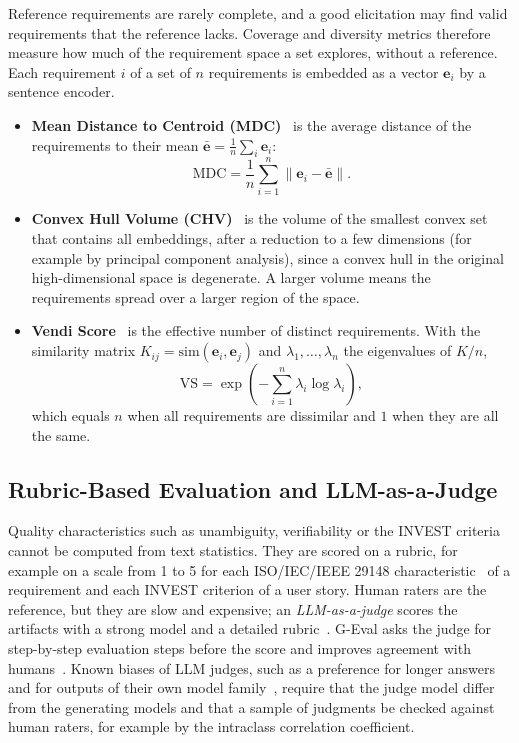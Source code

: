 Reference requirements are rarely complete, and a good elicitation may find valid requirements that the reference lacks. Coverage and diversity metrics therefore measure how much of the requirement space a set explores, without a reference. Each requirement $i$ of a set of $n$ requirements is embedded as a vector $\mathbf{e}_i$ by a sentence encoder.
\begin{itemize}
    \item \textbf{Mean Distance to Centroid (MDC)}~\cite{ataei2025elicitron, jin2025iredev} is the average distance of the requirements to their mean $\bar{\mathbf{e}} = \frac{1}{n}\sum_i \mathbf{e}_i$:
    \begin{equation}
        \mathrm{MDC} = \frac{1}{n}\sum_{i=1}^{n} \left\lVert \mathbf{e}_i - \bar{\mathbf{e}} \right\rVert .
    \end{equation}
    \item \textbf{Convex Hull Volume (CHV)}~\cite{ataei2025elicitron, jin2025iredev} is the volume of the smallest convex set that contains all embeddings, after a reduction to a few dimensions (for example by principal component analysis), since a convex hull in the original high-dimensional space is degenerate. A larger volume means the requirements spread over a larger region of the space.
    \item \textbf{Vendi Score}~\cite{friedman2023vendi} is the effective number of distinct requirements. With the similarity matrix $K_{ij} = \mathrm{sim}(\mathbf{e}_i, \mathbf{e}_j)$ and $\lambda_1, \dots, \lambda_n$ the eigenvalues of $K/n$,
    \begin{equation}
        \mathrm{VS} = \exp\!\left(-\sum_{i=1}^{n} \lambda_i \log \lambda_i\right),
    \end{equation}
    which equals $n$ when all requirements are dissimilar and $1$ when they are all the same.
\end{itemize}

\subsection{Rubric-Based Evaluation and LLM-as-a-Judge}
\label{sec:bg-metrics-judge}

Quality characteristics such as unambiguity, verifiability or the INVEST criteria cannot be computed from text statistics. They are scored on a rubric, for example on a scale from 1 to 5 for each ISO/IEC/IEEE 29148 characteristic~\cite{iso29148} of a requirement and each INVEST criterion of a user story. Human raters are the reference, but they are slow and expensive; an \emph{LLM-as-a-judge} scores the artifacts with a strong model and a detailed rubric~\cite{zheng2023judging}. G-Eval asks the judge for step-by-step evaluation steps before the score and improves agreement with humans~\cite{liu2023geval}. Known biases of LLM judges, such as a preference for longer answers and for outputs of their own model family~\cite{zheng2023judging}, require that the judge model differ from the generating models and that a sample of judgments be checked against human raters, for example by the intraclass correlation coefficient.

